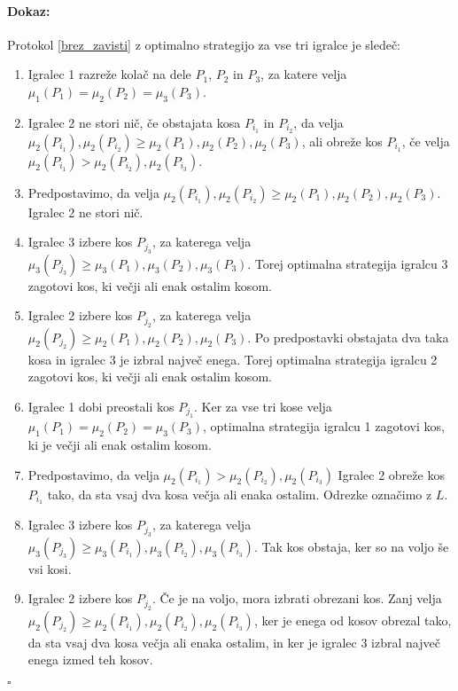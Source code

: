 \documentclass[a4paper, 12pt]{article}
\newenvironment{dokaz}{\paragraph{Dokaz:}}{\hfill$\square$\\}
\begin{document}
	\begin{dokaz}
		Protokol \ref{brez_zavisti} z optimalno strategijo za vse tri igralce je sledeč:
		\begin{enumerate}
			
			\item Igralec 1 razreže kolač na dele $P_1$, $P_2$ in $P_3$, za katere velja $\mu_1 (P_1) = \mu_2 (P_2) = \mu_3 (P_3)$.
			
			\item Igralec 2 ne stori nič, če obstajata kosa $P_{i_1}$ in $P_{i_2}$, da velja $\mu_2 (P_{i_1}), \mu_2 (P_{i_2}) \geq \mu_2 (P_1), \mu_2 (P_2), \mu_2 (P_3)$, ali obreže kos $P_{i_1}$, če velja $\mu_2 (P_{i_1}) > \mu_2 (P_{i_2}), \mu_2 (P_{i_3})$.
			
			\item[] Predpostavimo, da velja $\mu_2 (P_{i_1}), \mu_2 (P_{i_2}) \geq \mu_2 (P_1), \mu_2 (P_2), \mu_2 (P_3)$. Igralec 2 ne stori nič.
			
			\item \qquad Igralec 3 izbere kos $P_{j_3}$, za katerega velja $\mu_3 (P_{j_3}) \geq \mu_3 (P_1), \mu_3 (P_2), \mu_3 (P_3)$. Torej optimalna strategija igralcu 3 zagotovi kos, ki večji ali enak ostalim kosom.
			
			\item \qquad Igralec 2 izbere kos $P_{j_2}$, za katerega velja $\mu_2 (P_{j_2}) \geq \mu_2 (P_1), \mu_2 (P_2), \mu_2 (P_3)$. Po predpostavki obstajata dva taka kosa in igralec 3 je izbral največ enega. Torej optimalna strategija igralcu 2 zagotovi kos, ki večji ali enak ostalim kosom.
			
			\item \qquad Igralec 1 dobi preostali kos $P_{j_1}$. Ker za vse tri kose velja $\mu_1 (P_1) = \mu_2 (P_2) = \mu_3 (P_3)$, optimalna strategija igralcu 1 zagotovi kos, ki je večji ali enak ostalim kosom.
			
			\item[] Predpostavimo, da velja $\mu_2 (P_{i_1}) > \mu_2 (P_{i_2}), \mu_2 (P_{i_3})$ Igralec 2 obreže kos $P_{i_1}$ tako, da sta vsaj dva kosa večja ali enaka ostalim. Odrezke označimo z $L$.
			
			\setcounter{enumi}{2}
			
			\item \qquad Igralec 3 izbere kos $P_{j_3}$, za katerega velja $\mu_3 (P_{j_3}) \geq \mu_3 (P_{i_1}), \mu_3 (P_{i_2}), \mu_3 (P_{i_3})$. Tak kos obstaja, ker so na voljo še vsi kosi.
			
			\item \qquad Igralec 2 izbere kos $P_{j_2}$. Če je na voljo, mora izbrati obrezani kos. Zanj velja $\mu_2 (P_{j_2}) \geq \mu_2 (P_{i_1}), \mu_2 (P_{i_2}), \mu_2 (P_{i_3})$, ker je enega od kosov obrezal tako, da sta vsaj dva kosa večja ali enaka ostalim, in ker je igralec 3 izbral največ enega izmed teh kosov.
			

\end{enumerate}
\end{dokaz}
\end{document}
